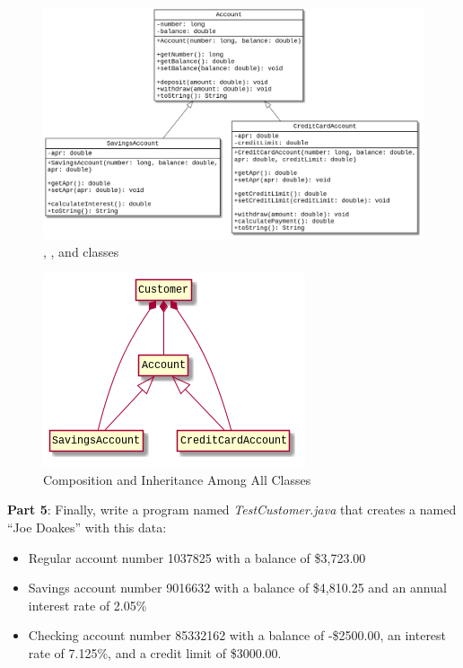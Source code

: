 \begin{exercise}
\begin{figure}[!ht]
\begin{center}
\includegraphics[scale=0.4]{figs/ch14/account_inheritance.png}
\caption{, , and  classes}
\label{fig.inheritance1}
\end{center}
\end{figure}

\begin{figure}[!ht]
\begin{center}
\includegraphics[scale=0.7]{figs/ch14/account_classes.png}
\caption{Composition and Inheritance Among All Classes}
\label{fig.inheritance2}
\end{center}
\end{figure}

{\bf Part 5}: Finally, write a program named {\em TestCustomer.java} that creates a  named ``Joe Doakes'' with this data:

\begin{itemize}
\item Regular account number 1037825 with a balance of \$3,723.00
\item Savings account number 9016632 with a balance of \$4,810.25 and an annual interest rate of 2.05\%
\item Checking account number 85332162 with a balance of -\$2500.00, an interest rate of 7.125\%, and a credit limit of \$3000.00.
\end{itemize}


\end{exercise}
